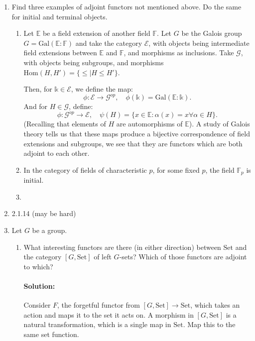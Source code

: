 \documentclass{article}
\begin{document}
\begin{enumerate} 
    \item Find three examples of adjoint functors not mentioned above. Do the same for initial and terminal objects.
        \begin{enumerate}
            \item Let $\mathbb{E}$ be a field extension of another field $\mathbb{F}$. Let $G$ be the Galois group $G=\mathrm{Gal}(\mathbb{E}:\mathbb{F})$ and take the category $\mathcal{E}$, with objects being intermediate field extensions between $\mathbb{E}$ and $\mathbb{F}$, and morphisms as inclusions. Take $\mathcal{G}$, with objects being subgroups, and morphisms $\mathrm{Hom}(H,H')=\{\leq |H\leq H'\} $.
                
                Then, for $\mathbb{k}\in \mathcal{E}$, we define the map:
                \[
                \phi:\mathcal{E}\to \mathcal{G}^{op},\quad\phi(\mathbb{k})= \mathrm{Gal}(\mathbb{E}:\mathbb{k})
                .\] 
                And for $H\in \mathcal{G}$, define:
                \[
                \phi:\mathcal{G}^{op}\to \mathcal{E},\quad\psi(H)=\{x\in \mathbb{E}:\alpha(x)=x\forall \alpha\in H\} 
                .\] 
                (Recalling that elements of $H$ are automorphisms of $\mathbb{E}$).
                A study of Galois theory tells us that these maps produce a bijective correspondence of field extensions and subgroups, we see that they are functors which are both adjoint to each other.
            \item In the category of fields of characteristic  $p$, for some fixed $p$, the field $\mathbb{F}_p$ is initial.
            \item 
        \end{enumerate}
    \item 2.1.14 (may be hard)

    \item Let $G$ be a group.
        \begin{enumerate}
            \item What interesting functors are there (in either direction) between $\mathrm{Set}$ and the category $[G, \mathrm{Set} ]$ of left $G$-sets? Which of those functors are adjoint to which?
                \paragraph{Solution: } Consider $F$, the forgetful functor from $[G,\mathrm{Set}]\to \mathrm{Set}$, which takes an action and maps it to the set it acts on. A morphism in $[G,\mathrm{Set}]$ is a natural transformation, which is a single map in $\mathrm{Set}.$ Map this to the same set function.


\end{enumerate}
\end{enumerate}
\end{document}
